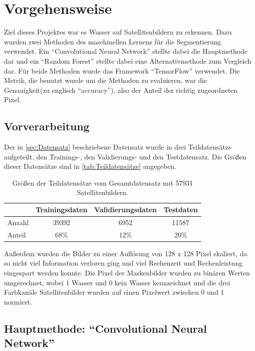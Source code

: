 \section{Vorgehensweise}
\label{sec:Vorgehensweise}

Ziel dieses Projektes war es Wasser auf Satellitenbildern zu erkennen.
Dazu wurden zwei Methoden des maschinellen Lernens für die Segmentierung verwendet.
Ein \enquote{Convolutional Neural Network} stellte dabei die Hauptmethode dar 
und ein \enquote{Random Forest} stellte dabei eine Alternativmethode zum Vergleich dar.
Für beide Methoden wurde das Framework \enquote{TensorFlow} verwendet.\cite{tensorflow}
Die Metrik, die benutzt wurde um die Methoden zu evaluieren, war die Genauigkeit(zu englisch \enquote{accuracy}), 
also der Anteil der richtig zugeordneten Pixel.

\subsection{Vorverarbeitung}
\label{ssec:Vorverarbeitung}

Der in \autoref{sec:Datensatz} beschriebene Datensatz wurde in drei Teildatensätze aufgeteilt,
den Trainings-, den Validierungs- und den Testdatensatz.
Die Größen dieser Datensätze sind in \autoref{tab:Teildatensätze} angegeben.

\begin{table}
    \centering
    \caption{Größen der Teildatensätze vom Gesamtdatensatz mit 57931 Satellitenbildern.}
    \label{tab:Teildatensätze}
    \begin{tabular}{l c c c}
        \toprule 
        & Trainingsdaten & Validierungsdaten & Testdaten \\ 
        \midrule 
        Anzahl & 39392 & 6952 & 11587 \\
        Anteil & 68\% & 12\% & 20\% \\
        \bottomrule
    \end{tabular}
\end{table}

Außerdem wurden die Bilder zu einer Auflösung von 128 x 128 Pixel skaliert, 
da so nicht viel Information verloren ging und viel Rechenzeit und Rechenleistung eingespart werden konnte.
Die Pixel der Maskenbilder wurden zu binären Werten umgerechnet, wobei 1 Wasser und 0 kein Wasser kennzeichnet
und die drei Farbkanäle Satellitenbilder wurden auf einen Pixelwert zwischen 0 und 1 normiert. 

\subsection{Hauptmethode: \enquote{Convolutional Neural Network}}
\label{ssec:Hauptmethode}

